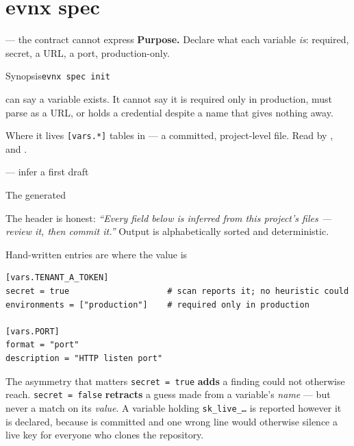 \section{evnx spec}

\begin{frame}{ — the contract  cannot express}
  \textbf{Purpose.} Declare what each variable \emph{is}: required, secret,
  a URL, a port, production-only.

  \begin{block}{Synopsis}\texttt{evnx spec init}\end{block}

   can say a variable exists. It cannot say it is required
  only in production, must parse as a URL, or holds a credential despite a name
  that gives nothing away.

  \vspace{0.6em}
  \begin{block}{Where it lives}
    \texttt{[vars.*]} tables in  — a committed, project-level
    file. Read by ,  and .
  \end{block}
\end{frame}

\begin{frame}[fragile]{ — infer a first draft}
\end{frame}

\begin{frame}[fragile]{The generated }

  {\footnotesize The header is honest: \emph{``Every field below is inferred
  from this project's files — review it, then commit it.''} Output is
  alphabetically sorted and deterministic.}
\end{frame}

\begin{frame}[fragile]{Hand-written entries are where the value is}
\begin{lstlisting}[style=evnxcode]
[vars.TENANT_A_TOKEN]
secret = true                    # scan reports it; no heuristic could
environments = ["production"]    # required only in production

[vars.PORT]
format = "port"
description = "HTTP listen port"
\end{lstlisting}

  \begin{block}{The asymmetry that matters}
    \texttt{secret = true} \textbf{adds} a finding  could not otherwise
    reach. \texttt{secret = false} \textbf{retracts} a guess made from a
    variable's \emph{name} — but never a match on its \emph{value}. A variable
    holding \texttt{sk\_live\_\ldots} is reported however it is declared, because
     is committed and one wrong line would otherwise silence a
    live key for everyone who clones the repository.
  \end{block}
\end{frame}

